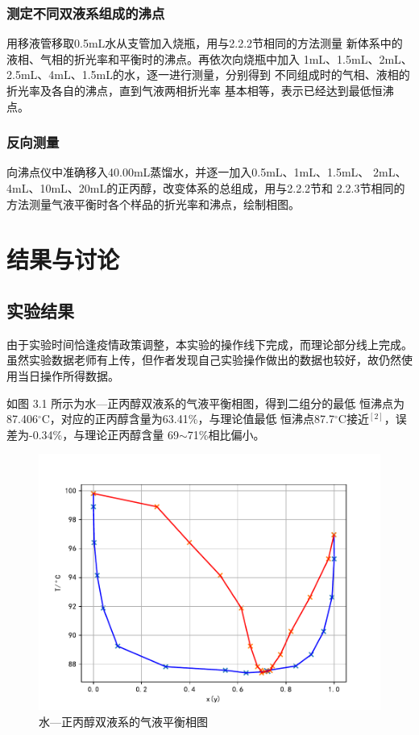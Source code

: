 \documentclass[12pt]{ctexart}
\numberwithin{equation}{section}
\begin{document}
\subsubsection{测定不同双液系组成的沸点}
用移液管移取0.5mL水从支管加入烧瓶，用与2.2.2节相同的方法测量
新体系中的液相、气相的折光率和平衡时的沸点。再依次向烧瓶中加入
1mL、1.5mL、2mL、2.5mL、4mL、1.5mL的水，逐一进行测量，分别得到
不同组成时的气相、液相的折光率及各自的沸点，直到气液两相折光率
基本相等，表示已经达到最低恒沸点。

\subsubsection{反向测量}
向沸点仪中准确移入40.00mL蒸馏水，并逐一加入0.5mL、1mL、1.5mL、
2mL、4mL、10mL、20mL的正丙醇，改变体系的总组成，用与2.2.2节和
2.2.3节相同的方法测量气液平衡时各个样品的折光率和沸点，绘制相图。

\section{结果与讨论}
\subsection{实验结果}
由于实验时间恰逢疫情政策调整，本实验的操作线下完成，而理论部分线上完成。虽然实验数据老师有上传，但作者发现自己实验操作做出的数据也较好，故仍然使用当日操作所得数据。

如图 3.1 所示为水—正丙醇双液系的气液平衡相图，得到二组分的最低
恒沸点为87.406$^\circ$C，对应的正丙醇含量为63.41\%，与理论值最低
恒沸点87.7$^\circ$C接近$^{[2]}$，误差为-0.34\%，与理论正丙醇含量
69$\sim$71\%相比偏小。

\begin{figure}[!h]
    \centering
    \includegraphics[scale=1.0]{xiangtu.pdf}
    \caption{水—正丙醇双液系的气液平衡相图}
\end{figure}
\end{document}
